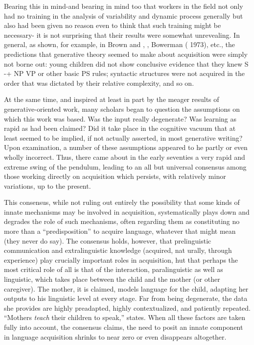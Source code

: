 Bearing this in mind-and bearing in mind too that workers in the field not only had no training in the analysis of variability and dynamic process generally but also had been given no reason even to think that such training might be necessary- it is not surprising that their results were somewhat unrevealing. In general, as shown, for example, in Brown and \citet{Hanlon1970}, \citet{Brown1973}, Bowerman ( 1973), etc., the predictions that generative theory seemed to make about acquisition were simply not borne out: young children did not
show conclusive evidence that they knew S {}-+ NP VP or other basic PS
rules; syntactic structures were not acquired in the order that was dictated by their relative complexity, and so on.

At the same time, and inspired at least in part by the meager results of generative-oriented work, many scholars began to question the assumptions on which this work was based. Was the input really degenerate? Was learning as rapid as had been claimed? Did it take place in the cognitive vacuum that at least seemed to be implied, if not actually asserted, in most generative writing? Upon examination, a number of these assumptions appeared to he partly or even wholly incorrect. Thus, there came about in the early seventies a very rapid and extreme swing of the pendulum, leading to an all but universal consensus among those working directly on acquisition which persists, with relatively minor variations, up to the present.

This consensus, while not ruling out entirely the possibility that some kinds of innate mechanisms may be involved in acquisition, systematically plays down and degrades the role of such mechanisms, often regarding them as constituting no more than a ``predisposition'' to acquire language, whatever that might mean (they never do say). The consensus holds, however, that prelinguistic communication and extralinguistic knowledge (acquired, nat urally, through experience) play crucially important roles in acquisition, hut that perhaps the most critical role of all is that of the interaction, paralinguistic as well as linguistic, which takes place between the child and the mother (or other caregiver). The mother, it is claimed, models language for the child, adapting her outputs to his linguistic level at every stage. Far from being degenerate, the data she provides are highly preadapted, highly contextualized, and patiently repeated. ``Mothers \textit{teach} their children to speak,'' \citet{Bruner1979} states. When all these factors are taken fully into account, the consensus claims, the need to posit an innate component in language acquisition shrinks to near zero or even disappears altogether.

